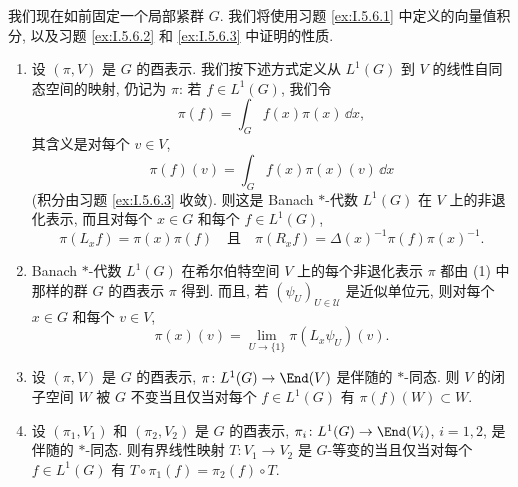 我们现在如前固定一个局部紧群 $G$. 我们将使用习题 \ref{ex:I.5.6.1} 中定义的向量值积分, 以及习题 \ref{ex:I.5.6.2} 和 \ref{ex:I.5.6.3} 中证明的性质.

\begin{theorem}
\label{thm:I.4.2.6}
\begin{enumerate}
\item[(1)] 设 $(\pi, V)$ 是 $G$ 的酉表示. 我们按下述方式定义从 $L^1(G)$ 到 $V$ 的线性自同态空间的映射, 仍记为 $\pi$: 若 $f \in L^1(G)$, 我们令
\[
\pi(f) = \int_G f(x)\pi(x)\,\dd x,
\]
其含义是对每个 $v \in V$,
\[
\pi(f)(v) = \int_G f(x)\pi(x)(v)\,\dd x
\]
(积分由习题 \ref{ex:I.5.6.3} 收敛). 则这是 Banach $*$-代数 $L^1(G)$ 在 $V$ 上的非退化表示, 而且对每个 $x \in G$ 和每个 $f \in L^1(G)$,
\[
\pi(L_xf) = \pi(x)\pi(f) \quad \text{且} \quad \pi(R_xf) = \Delta(x)^{-1}\pi(f)\pi(x)^{-1}.
\]
\item[(2)] Banach $*$-代数 $L^1(G)$ 在希尔伯特空间 $V$ 上的每个非退化表示 $\pi$ 都由 (1) 中那样的群 $G$ 的酉表示 $\pi$ 得到.
而且, 若 $(\psi_U)_{U \in \mathcal{U}}$ 是近似单位元, 则对每个 $x \in G$ 和每个 $v \in V$,
\[
\pi(x)(v) = \lim_{U \to \{1\}}\pi(L_x\psi_U)(v).
\]
\item[(3)] 设 $(\pi, V)$ 是 $G$ 的酉表示, $\pi \colon L^1(G) \to \End(V)$ 是伴随的 $*$-同态. 则 $V$ 的闭子空间 $W$ 被 $G$ 不变当且仅当对每个 $f \in L^1(G)$ 有 $\pi(f)(W) \subset W$.
\item[(4)] 设 $(\pi_1, V_1)$ 和 $(\pi_2, V_2)$ 是 $G$ 的酉表示, $\pi_i \colon L^1(G) \to \End(V_i)$, $i = 1, 2$, 是伴随的 $*$-同态. 则有界线性映射 $T \colon V_1 \to V_2$ 是 $G$-等变的当且仅当对每个 $f \in L^1(G)$ 有 $T \circ \pi_1(f) = \pi_2(f) \circ T$.
\end{enumerate}
\end{theorem}

